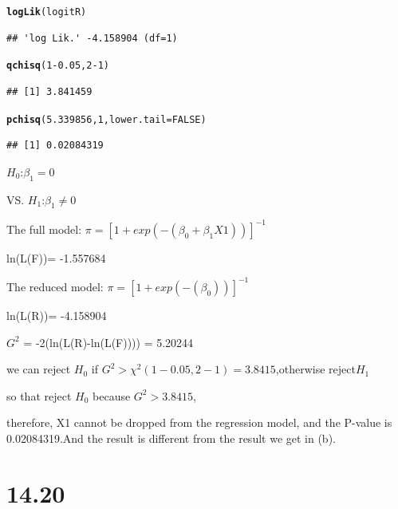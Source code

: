 \documentclass{article}\usepackage[]{graphicx}\usepackage[]{color}
\makeatletter
\newcommand{\hlnum}[1]{\textcolor[rgb]{0.686,0.059,0.569}{#1}}%
\newcommand{\hlopt}[1]{\textcolor[rgb]{0,0,0}{#1}}%
\newcommand{\hlstd}[1]{\textcolor[rgb]{0.345,0.345,0.345}{#1}}%
\newcommand{\hlkwc}[1]{\textcolor[rgb]{0.333,0.667,0.333}{#1}}%
\newcommand{\hlkwd}[1]{\textcolor[rgb]{0.737,0.353,0.396}{\textbf{#1}}}%
\newenvironment{kframe}{%
 \def\at@end@of@kframe{}%
 \ifinner\ifhmode%
  \def\at@end@of@kframe{\end{minipage}}%
  \begin{minipage}{\columnwidth}%
 \fi\fi%
 \def\FrameCommand##1{\hskip\@totalleftmargin \hskip-\fboxsep
 \colorbox{shadecolor}{##1}\hskip-\fboxsep
     \hskip-\linewidth \hskip-\@totalleftmargin \hskip\columnwidth}%
 \MakeFramed {\advance\hsize-\width
   \@totalleftmargin\z@ \linewidth\hsize
   \@setminipage}}%
 {\par\unskip\endMakeFramed%
 \at@end@of@kframe}
\newenvironment{knitrout}{}{} %
\makeatother
\begin{document}
\begin{enumerate}[(a)]
\begin{knitrout}
\begin{kframe}
{\ttfamily\noindent\color{warningcolor}{\#\# Warning: non-integer \#successes in a binomial glm!}}\begin{alltt}
  \hlkwd{logLik}\hlstd{(logitR)}
\end{alltt}
\begin{verbatim}
## 'log Lik.' -4.158904 (df=1)
\end{verbatim}
\begin{alltt}
  \hlkwd{qchisq}\hlstd{(}\hlnum{1}\hlopt{-}\hlnum{0.05}\hlstd{,} \hlnum{2}\hlopt{-}\hlnum{1}\hlstd{)}
\end{alltt}
\begin{verbatim}
## [1] 3.841459
\end{verbatim}
\begin{alltt}
  \hlkwd{pchisq}\hlstd{(}\hlnum{5.339856}\hlstd{,} \hlnum{1}\hlstd{,} \hlkwc{lower.tail} \hlstd{=} \hlnum{FALSE}\hlstd{)}
\end{alltt}
\begin{verbatim}
## [1] 0.02084319
\end{verbatim}
\end{kframe}
\end{knitrout}

\begin{center}
$H_0$:$\beta_1=0$

VS. $H_1$:$\beta_1 \ne 0$

The full model: $\pi = [1 + exp(-(\beta_0 + \beta_1 X1))]^{-1} $

ln(L(F))= -1.557684

The reduced model: $\pi = [1 + exp(-(\beta_0))]^{-1} $

ln(L(R))= -4.158904

$G^2$ = -2(ln(L(R)-ln(L(F)))) = 5.20244

we can reject $H_0$ if $G^2 > \chi^2(1-0.05, 2-1)=3.8415$,otherwise reject$H_1$

so that reject $H_0$ because $G^2 >3.8415$,

therefore, X1 cannot be dropped from the regression model, and the P-value is 0.02084319.And the result is different from the result we get in (b).
\end{center}

\end{enumerate}

\section{14.20}
\end{document}
